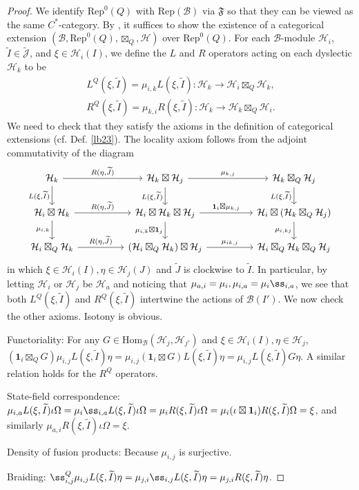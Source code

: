 \documentclass[11pt,b5paper,notitlepage]{article}
\theoremstyle{definition}
\theoremstyle{plain}
\newcommand{\fk}{\mathfrak}
\newcommand{\mc}{\mathcal}
\newcommand{\wtd}{\widetilde}
\newcommand{\id}{\mathbf{1}}
\newcommand{\Hom}{\mathrm{Hom}}
\newcommand{\Rep}{\mathrm{Rep}}
\newcommand{\Jtd}{\widetilde{\mathcal J}}
\numberwithin{equation}{section}
\begin{document}
\begin{proof}
We identify $\Rep^0(Q)$ with $\Rep(\mc B)$ via $\fk F$ so that they can be viewed as the same $C^*$-category. By \cite[Thm. 3.10]{Gui21a}, it suffices to show the existence of a categorical extension $(\mc B,\Rep^0(Q),\boxtimes_Q,\mc H)$ over $\Rep^0(Q)$. For each $\mc B$-module $\mc H_i$, $\wtd I\in\Jtd$, and $\xi\in\mc H_i(I)$, we define the $L$ and $R$ operators acting on each dyslectic $\mc H_k$ to be
\begin{gather*}
L^Q(\xi,\wtd I)=\mu_{i,k} L(\xi,\wtd I):\mc H_k\rightarrow\mc H_i\boxtimes_Q\mc H_k,\\
R^Q(\xi,\wtd I)=\mu_{k,i}R(\xi,\wtd I):\mc H_k\rightarrow\mc H_k\boxtimes_Q\mc H_i.
\end{gather*}
We need to check that they satisfy the axioms in the definition of categorical extensions (cf. Def. \ref{lb23}). The locality axiom follows from the adjoint commutativity of the diagram
\begin{equation}
	\begin{tikzcd}
\mc H_k\arrow[rr,"{R(\eta,\wtd J)}"]\arrow[d,"{L(\xi,\wtd I)}"'] &&\mc H_k\boxtimes\mc H_j\arrow[rr,"\mu_{k,j}"]\arrow[d,"{L(\xi,\wtd I)}"']&&\mc H_k\boxtimes_Q\mc H_j\arrow[d,"{L(\xi,\wtd I)}"']\\
		\mc H_i\boxtimes\mc H_k\arrow[rr,"{R(\eta,\wtd J)}"]\arrow[d,"\mu_{i,k}"']&&\mc H_i\boxtimes\mc H_k\boxtimes\mc H_j\arrow[rr,"\id_i\boxtimes\mu_{k,j}"]\arrow[d,"\mu_{i,k}\boxtimes\id_j"']&&\mc H_i\boxtimes(\mc H_k\boxtimes_Q\mc H_j)\arrow[d,"\mu_{i,kj}"']\\
		\mc H_i\boxtimes_Q\mc H_k\arrow[rr,"{R(\eta,\wtd J)}"]&&\mc(	\mc H_i\boxtimes_Q\mc H_k)\boxtimes\mc H_j\arrow[rr,"\mu_{ik,j}"]&&\mc H_i\boxtimes_Q\mc H_k\boxtimes_Q\mc H_j 
	\end{tikzcd}
\end{equation}
in which $\xi\in\mc H_i(I),\eta\in\mc H_j(J)$ and $\wtd J$ is clockwise to $\wtd I$. In particular, by letting $\mc H_i$ or $\mc H_j$ be $\mc H_a$ and noticing that $\mu_{a,i}=\mu_i,\mu_{i,a}=\mu_i\ss_{i,a}$, we see that both $L^Q(\xi,\wtd I)$ and $R^Q(\xi,\wtd I)$ intertwine the actions of $\mc B(I')$. We now check the other axioms. Isotony is obvious.

Functoriality: For any $G\in\Hom_{\mc B}(\mc H_j,\mc H_{j'})$ and $\xi\in\mc H_i(I),\eta\in\mc H_j$, $(\id_i\boxtimes_Q G)\mu_{i,j}L(\xi,\wtd I)\eta=\mu_{i,j}(\id_i\boxtimes G)L(\xi,\wtd I)\eta=\mu_{i,j}L(\xi,\wtd I)G\eta$. A similar relation holds for the $R^Q$ operators.

State-field correspondence: $\mu_{i,a}L(\xi,\wtd I)\iota\Omega=\mu_i\ss_{i,a}L(\xi,\wtd I)\iota\Omega=\mu_i R(\xi,\wtd I)\iota\Omega=\mu_i(\iota\boxtimes\id_i)R(\xi,\wtd I)\Omega=\xi$, and similarly $\mu_{a,i}R(\xi,\wtd I)\iota \Omega=\xi$.

Density of fusion products: Because $\mu_{i,j}$ is surjective.

Braiding: $\ss^Q_{i,j}\mu_{i,j}L(\xi,\wtd I)\eta=\mu_{j,i}\ss_{i,j}L(\xi,\wtd I)\eta=\mu_{j,i}R(\xi,\wtd I)\eta$.
\end{proof}
\end{document}
